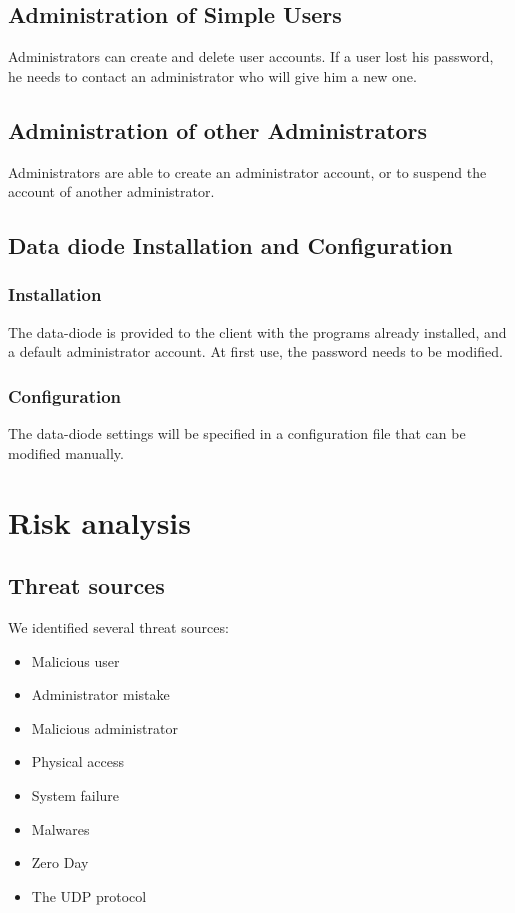 \documentclass[a4paper,11pt]{article}
\begin{document}
\subsection{Administration of Simple Users}
Administrators can create and delete user accounts. If a user lost his password, he needs to contact an administrator who will give him a new one.

\subsection{Administration of other Administrators}
Administrators are able to create an administrator account, or to suspend the account of another administrator.
\subsection{Data diode Installation and Configuration}
\subsubsection{Installation}
The data-diode is provided to the client with the programs already installed, and a default administrator account. At first use, the password needs to be modified.
\subsubsection{Configuration}
The data-diode settings will be specified in a configuration file that can be modified manually.
\section{Risk analysis}

\subsection{Threat sources}
We identified several threat sources:\\
\begin{itemize}
\item Malicious user 
\item Administrator mistake
\item Malicious administrator
\item Physical access
\item System failure
\item Malwares
\item Zero Day
\item The UDP protocol
\end{itemize}
\end{document}
